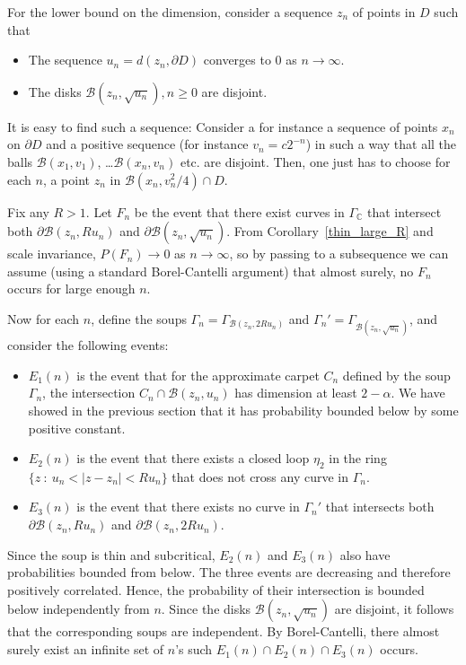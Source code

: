 \documentclass[11pt]{article}
\newcommand{\C}{{{\mathbb C}}}
\newcommand{\PP}{{ P}}
\newcommand{\cir}{\partial \B}
\newcommand{\B}{{\mathcal B}}
\begin{document}
For the lower bound on the dimension, consider a sequence $z_n$ of points in $D$ such that
\begin {itemize}
\item The sequence $u_n= d(z_n, \partial D)$ converges to $0$ as $n \to \infty$.
\item The disks $\B (z_n, \sqrt {u_n}), n \ge 0$ are disjoint.
\end {itemize}
It is easy to find such a sequence: Consider a for instance a sequence of points $x_n$ on $\partial D$ and a positive sequence (for instance $v_n= c 2^{-n}$)  in such a way that all the balls
$\B (x_1, v_1)$, \ldots $\B(x_n , v_n)$ etc. are disjoint. Then, one just has to choose for each $n$, a point $z_n$ in $\B (x_n, v_n^2/4) \cap D$.
 
Fix any $R>1$.
Let $F_n$ be the event that there exist curves in $\Gamma_\C$ that intersect both 
$\cir (z_n, Ru_n)$ and $\cir (z_n, \sqrt {u_n})$. 
From Corollary~\ref{thin_large_R} and scale invariance, 
$\PP(F_n) \rightarrow 0$ as $n \rightarrow \infty$,
so by passing to a subsequence we can assume (using a standard
Borel-Cantelli argument) that almost surely, no $F_n$ occurs for large enough $n$.

Now for each $n$, define the soups 
$\Gamma_n = \Gamma_{\B(z_n, 2Ru_n)}$ and  
$\Gamma_n'= \Gamma_{\B(z_n, \sqrt {u_n})}$, and consider the following events:
\begin {itemize}

\item $E_1 (n)$ is the event that for the approximate carpet $C_n$ defined by
the soup $\Gamma_n$, the intersection $C_n \cap \B (z_n, u_n)$ 
has dimension at least $2 - \alpha$. We have showed in the previous section
that it has probability bounded below by some positive constant.

\item $E_2 (n)$ is the event that
there exists a closed loop $\eta_2$ in the ring 
$\{z \ : \ u_n < | z - z_n | < Ru_n \}$ 
that does not cross any curve in $\Gamma_n$.

\item $E_3 (n)$ is the event that there exists no curve 
in $\Gamma_n'$ that intersects both $\cir (z_n,Ru_n)$ and $\cir (z_n, 2Ru_n)$.
\end {itemize}
Since the soup is thin and subcritical, $E_2 (n)$ and $E_3 (n)$ also have probabilities
bounded from below.
The three events are decreasing and therefore positively correlated. 
Hence, the probability of their intersection is bounded below 
independently from $n$. 
Since the disks $\B(z_n , \sqrt {u_n})$ are disjoint, 
it follows that the corresponding soups are independent. 
By Borel-Cantelli, there almost surely exist an infinite set of $n$'s such 
$E_1 (n) \cap E_2 (n) \cap E_3 (n)$ occurs. 
\end{document}
